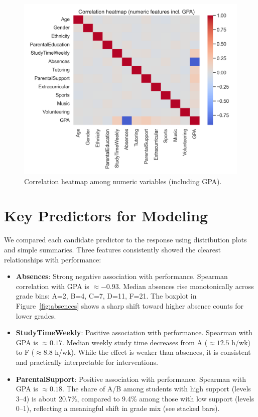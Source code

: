 \documentclass[11pt]{article}
\begin{document}
\begin{figure}[H]
	\centering
	\includegraphics[width=.9\textwidth]{figures/correlation_heatmap.png}
	\caption{Correlation heatmap among numeric variables (including GPA).}\label{fig:corr-heatmap}
\end{figure}

\section*{Key Predictors for Modeling}
We compared each candidate predictor to the response using distribution plots and simple summaries. Three features consistently showed the clearest relationships with performance:
\begin{itemize}[leftmargin=*]
	\item \textbf{Absences}: Strong negative association with performance. Spearman correlation with GPA is $\approx -0.93$. Median absences rise monotonically across grade bins: A=2, B=4, C=7, D=11, F=21. The boxplot in Figure~\ref{fig:absences} shows a sharp shift toward higher absence counts for lower grades.
	\item \textbf{StudyTimeWeekly}: Positive association with performance. Spearman with GPA is $\approx 0.17$. Median weekly study time decreases from A ($\approx 12.5$ h/wk) to F ($\approx 8.8$ h/wk). While the effect is weaker than absences, it is consistent and practically interpretable for interventions.
	\item \textbf{ParentalSupport}: Positive association with performance. Spearman with GPA is $\approx 0.18$. The share of A/B among students with high support (levels 3--4) is about 20.7\%, compared to 9.4\% among those with low support (levels 0--1), reflecting a meaningful shift in grade mix (see stacked bars).
\end{itemize}
\end{document}

